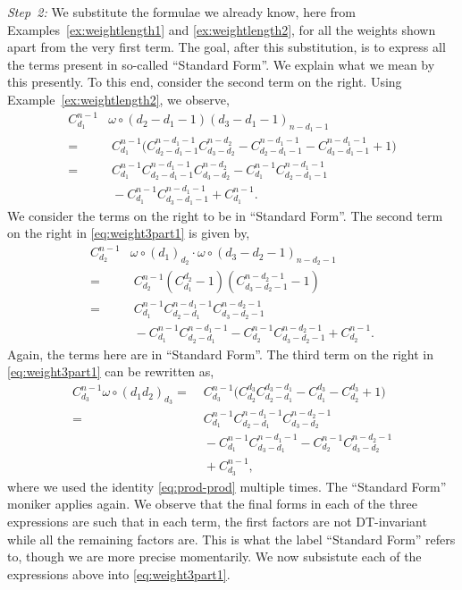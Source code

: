 \documentclass[5p,twocolumn]{elsarticle}
\begin{document}
\begin{example}
  \emph{Step~2:} We substitute the formulae we already know, here from Examples~\ref{ex:weightlength1} and \ref{ex:weightlength2}, for all the weights shown apart from the very first term.
  The goal, after this substitution, is to express all the terms present in so-called ``Standard Form''. We explain what we mean by this presently.
  To this end, consider the second term on the right. Using Example~\ref{ex:weightlength2}, we observe,
  \begin{align*}
    C_{d_1}^{n-1}&\omega\circ(d_2-d_1-1)(d_3-d_1-1)_{n-d_1-1}\\
                          =&\;C_{d_1}^{n-1}\bigl(C^{n-d_1-1}_{d_2-d_1-1}C^{n-d_2}_{d_3-d_2}-C^{n-d_1-1}_{d_2-d_1-1}-C^{n-d_1-1}_{d_3-d_1-1}+1\bigr)\\
                          =&\;C_{d_1}^{n-1}C^{n-d_1-1}_{d_2-d_1-1}C^{n-d_2}_{d_3-d_2}-C_{d_1}^{n-1}C^{n-d_1-1}_{d_2-d_1-1}\\
                           &\;-C_{d_1}^{n-1}C^{n-d_1-1}_{d_3-d_1-1}+C_{d_1}^{n-1}.
  \end{align*}
  We consider the terms on the right to be in ``Standard Form''. 
  The second term on the right in \eqref{eq:weight3part1} is given by, 
  \begin{align*}
    C_{d_2}^{n-1}&\omega\circ(d_1)_{d_2}\cdot\omega\circ(d_3-d_2-1)_{n-d_2-1}\\
              =&\;C_{d_2}^{n-1}(C_{d_1}^{d_2}-1)(C_{d_3-d_2-1}^{n-d_2-1}-1)\\
              =&\;C_{d_1}^{n-1}C_{d_2-d_1}^{n-d_1-1}C_{d_3-d_2-1}^{n-d_2-1}\\
              &\;-C_{d_1}^{n-1}C_{d_2-d_1}^{n-d_1-1}-C_{d_2}^{n-1}C_{d_3-d_2-1}^{n-d_2-1}+C_{d_2}^{n-1}.
  \end{align*}
  Again, the terms here are in ``Standard Form''. The third term on the right in \eqref{eq:weight3part1} can be rewritten as, 
  \begin{align*}
    C_{d_3}^{n-1}\omega\circ(d_1d_2)_{d_3}
              =&\;C_{d_3}^{n-1}\bigl(C_{d_2}^{d_3}C_{d_2-d_1}^{d_3-d_1}-C_{d_1}^{d_3}-C_{d_2}^{d_3}+1\bigr)\\
              =&\;C_{d_1}^{n-1}C_{d_2-d_1}^{n-d_1-1}C_{d_3-d_2}^{n-d_2-1}\\
               &\;-C_{d_1}^{n-1}C_{d_3-d_1}^{n-d_1-1}-C_{d_2}^{n-1}C_{d_3-d_2}^{n-d_2-1}\\
               &\;+C_{d_3}^{n-1},
  \end{align*}
  where we used the identity \eqref{eq:prod-prod} multiple times. The ``Standard Form'' moniker applies again.
  We observe that the final forms in each of the three expressions are such that in each term, the first factors are not DT-invariant while all the remaining factors are. 
  This is what the label ``Standard Form'' refers to, though we are more precise momentarily.
  We now subsistute each of the expressions above into \eqref{eq:weight3part1}.


\end{example}
\end{document}
